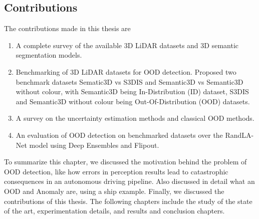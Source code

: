 \subsection{Contributions}
The contributions made in this thesis are
\begin{enumerate}
    \item A complete survey of the available 3D LiDAR datasets and 3D semantic segmentation models.
    \item Benchmarking of 3D LiDAR datasets for OOD detection. Proposed two benchmark datasets Sematic3D vs S3DIS and Semantic3D vs Semantic3D without colour, with Semantic3D being In-Distribution (ID) dataset, S3DIS and Semantic3D without colour being Out-Of-Distribution (OOD) datasets.
    \item A survey on the uncertainty estimation methods and classical OOD methods.
    \item An evaluation of OOD detection on benchmarked datasets over the RandLA-Net model using Deep Ensembles and Flipout.
\end{enumerate}

To summarize this chapter, we discussed the motivation behind the problem of OOD detection, like
how errors in perception results lead to catastrophic consequences in an autonomous driving pipeline.
Also discussed in detail what an OOD and Anomaly are, using a ship example. Finally, we
discussed the contributions of this thesis. The following chapters include the study of the state of the art,
experimentation details, and results and conclusion chapters.

